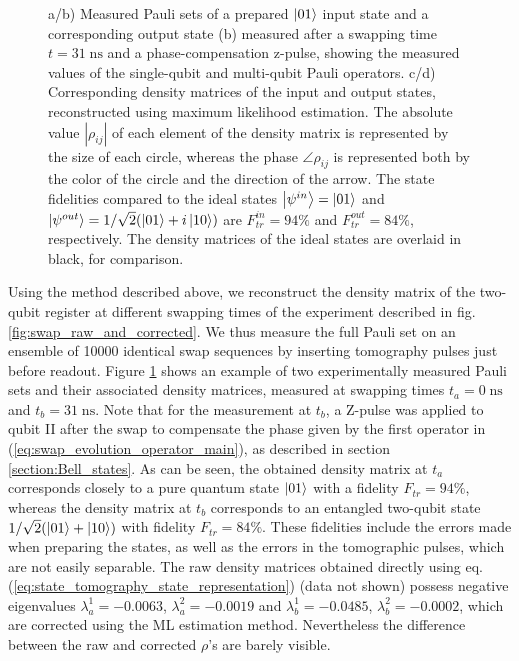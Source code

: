 \begin{figure}[ht!]
\begin{tabular}{ll}
	\end{tabular}
	\caption[]{a/b) Measured Pauli sets of a prepared $\left| 01 \right>$ input state and a corresponding output state (b) measured after a swapping time $t=31\;\mathrm{ns}$ and a phase-compensation z-pulse, showing the measured values of the single-qubit and multi-qubit Pauli operators. c/d) Corresponding density matrices of the input and output states, reconstructed using maximum likelihood estimation. The absolute value $|\rho_{ij}|$ of each element of the density matrix is represented by the size of each circle, whereas the phase $\angle \rho_{ij}$ is represented both by the color of the circle and the direction of the arrow. The state fidelities compared to the ideal states $\left| \psi^{in} \right>=\left| 01 \right>$ and $\left| \psi^{out} \right>=1/\sqrt{2}(\left| 01 \right>+i\left| 10 \right>)$ are $F^{in}_{tr}=94\%$ and $F^{out}_{tr}=84\%$, respectively. The density matrices of the ideal states are overlaid in black, for comparison.}
	\label{fig:pauli_set_example}
\end{figure}

Using the method described above, we reconstruct the density matrix of the two-qubit register at different swapping times of the experiment described in fig. \ref{fig:swap_raw_and_corrected}. We thus measure the full Pauli set on an ensemble of 10000 identical swap sequences by inserting tomography pulses just before readout. Figure \ref{fig:pauli_set_example} shows an example of two experimentally measured Pauli sets and their associated density matrices, measured at swapping times $t_a=0\;\mathrm{ns}$ and $t_b= 31\;\mathrm{ns}$. Note that for the measurement at $t_b$, a Z-pulse was applied to qubit II after the swap to compensate the phase given by the first operator in (\ref{eq:swap_evolution_operator_main}), as described in section \ref{section:Bell_states}. As can be seen, the obtained density matrix at $t_a$ corresponds closely to a pure quantum state $\left| 01 \right>$ with a fidelity $F_{tr}=94\%$, whereas the density matrix at $t_b$ corresponds to an entangled two-qubit state $1/\sqrt{2}(\left| 01 \right>+\left| 10 \right>)$ with fidelity $F_{tr}=84\%$. These fidelities include the errors made when preparing the states, as well as the errors in the tomographic pulses, which are not easily separable. The raw density matrices obtained directly using eq. (\ref{eq:state_tomography_state_representation}) (data not shown) possess negative eigenvalues $\lambda_{a}^1=-0.0063$, $\lambda_a^2=-0.0019$ and $\lambda_b^1=-0.0485$, $\lambda_b^2=-0.0002$, which are corrected using the ML estimation method. Nevertheless the difference between the raw and corrected $\rho$'s are barely visible.

